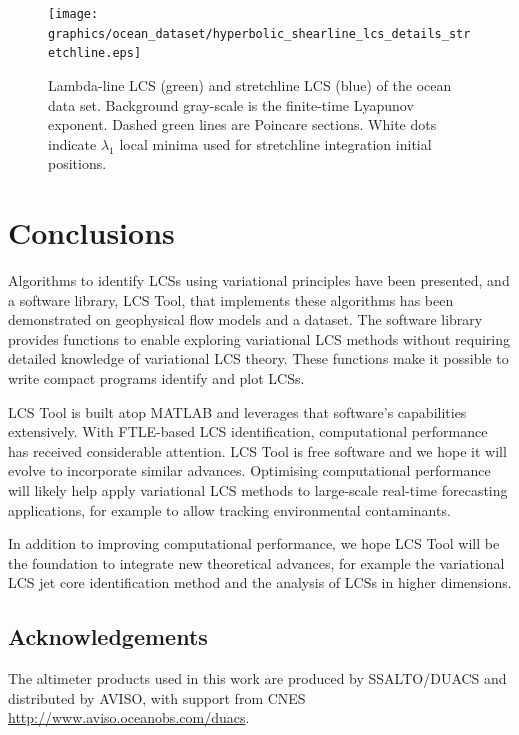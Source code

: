 \documentclass{article}
\begin{document}
\begin{figure}
\begin{center}
\texttt{[image: graphics/ocean\_dataset/hyperbolic\_shearline\_lcs\_details\_stretchline.eps]}
\end{center}
\caption{Lambda-line LCS (green) and stretchline LCS (blue) of the ocean data set. Background gray-scale is the finite-time Lyapunov exponent. Dashed green lines are Poincare sections. White dots indicate $\lambda_1$ local minima used for stretchline integration initial positions.}
\label{f:ocean dataset hyperbolic shear lcs details stretchline}
\end{figure}

\section{Conclusions}

Algorithms to identify LCSs using variational principles have been presented, and a software library, LCS Tool, that implements these algorithms has been demonstrated on geophysical flow models and a dataset. The software library provides functions to enable exploring variational LCS methods without requiring detailed knowledge of variational LCS theory. These functions make it possible to write compact programs identify and plot LCSs.

LCS Tool is built atop MATLAB\parencite{mathworks13:_matlab} and leverages that software's capabilities extensively. With FTLE-based LCS identification, computational performance has received considerable attention\parencite{conti12:_gpu_apu_finit_time_lyapun_expon,miron12:_anisot_lagran_coher_struc}. LCS Tool is free software and we hope it will evolve to incorporate similar advances. Optimising computational performance will likely help apply variational LCS methods to large-scale real-time forecasting applications, for example to allow tracking environmental contaminants.


In addition to improving computational performance, we hope LCS Tool will be the foundation to integrate new theoretical advances, for example the variational LCS jet core identification method\parencite{farazmand13:_shearless} and the 
analysis of LCSs in higher dimensions\parencite{blazevski:_hyper_ellip_trans_barrier_three}.

\subsection*{Acknowledgements}

The altimeter products used in this work are produced by SSALTO/DUACS and distributed by AVISO, with support from CNES \url{http://www.aviso.oceanobs.com/duacs}.

\printbibliography
\end{document}
